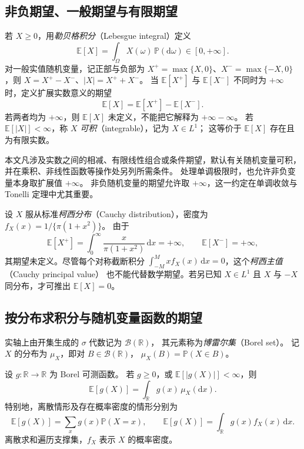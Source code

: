 \documentclass[UTF8,12pt,a4paper,fontset=fandol]{ctexart}
\begin{document}
\subsection{非负期望、一般期望与有限期望}

\begin{definition}[数学期望与可积性]
\label{def:expectation-integrability}
若 $X\geq0$，用\emph{勒贝格积分}（Lebesgue integral）定义
\[
  \mathbb E[X]=\int_\Omega X(\omega)\,\mathbb P(\mathrm d\omega)\in[0,+\infty].
\]
对一般实值随机变量，记正部与负部为
$X^+=\max\{X,0\}$、$X^-=\max\{-X,0\}$，则
$X=X^+-X^-$、$|X|=X^++X^-$。
当 $\mathbb E[X^+]$ 与 $\mathbb E[X^-]$ 不同时为 $+\infty$ 时，定义扩展实数意义的期望
\[
  \mathbb E[X]=\mathbb E[X^+]-\mathbb E[X^-].
\]
若两者均为 $+\infty$，则 $\mathbb E[X]$ 未定义，不能把它解释为 $+\infty-\infty$。
若 $\mathbb E[|X|]<\infty$，称 $X$ \emph{可积}（integrable），记为 $X\in L^1$；
这等价于 $\mathbb E[X]$ 存在且为有限实数。
\end{definition}

本文凡涉及实数之间的相减、有限线性组合或条件期望，默认有关随机变量可积，
并在乘积、非线性函数等操作处另列所需条件。
处理单调极限时，也允许非负变量本身取扩展值 $+\infty$。
非负随机变量的期望允许取 $+\infty$，这一约定在单调收敛与 Tonelli 定理中尤其重要。

\begin{example}[对称不保证期望为零]
\label{ex:expectation-cauchy}
设 $X$ 服从标准\emph{柯西分布}（Cauchy distribution），密度为
$f_X(x)=1/\{\pi(1+x^2)\}$。
由于
\[
  \mathbb E[X^+]=\int_0^\infty\frac{x}{\pi(1+x^2)}\,\mathrm dx=+\infty,
  \qquad \mathbb E[X^-]=+\infty,
\]
其期望未定义。尽管每个对称截断积分
$\int_{-M}^{M}x f_X(x)\,\mathrm dx=0$，这个\emph{柯西主值}（Cauchy principal value）
也不能代替数学期望。若另已知 $X\in L^1$ 且 $X$ 与 $-X$ 同分布，才可推出 $\mathbb E[X]=0$。
\end{example}

\subsection{按分布求积分与随机变量函数的期望}

实轴上由开集生成的 $\sigma$ 代数记为 $\mathcal B(\mathbb R)$，
其元素称为\emph{博雷尔集}（Borel set）。
记 $X$ 的分布为 $\mu_X$，即对 $B\in\mathcal B(\mathbb R)$，
$\mu_X(B)=\mathbb P(X\in B)$。

\begin{theorem}[分布积分公式]
\label{thm:expectation-lotus}
设 $g:\mathbb R\to\mathbb R$ 为 Borel 可测函数。
若 $g\geq0$，或 $\mathbb E[|g(X)|]<\infty$，则
\begin{equation}
  \mathbb E[g(X)]=\int_{\mathbb R}g(x)\,\mu_X(\mathrm dx).
  \label{eq:expectation-lotus}
\end{equation}
特别地，离散情形及存在概率密度的情形分别为
\[
  \mathbb E[g(X)]=\sum_x g(x)\mathbb P(X=x),
  \qquad
  \mathbb E[g(X)]=\int_{\mathbb R}g(x)f_X(x)\,\mathrm dx.
\]
离散求和遍历支撑集，$f_X$ 表示 $X$ 的概率密度。
\end{theorem}
\end{document}
